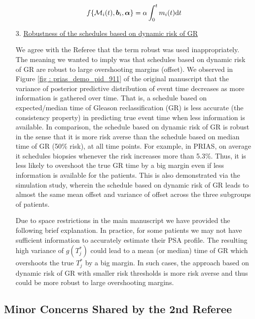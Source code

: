 \begin{enumerate}
    \begin{equation}
    f\{\mathcal{M}_i(t), \boldsymbol{b}_i, \boldsymbol{\alpha}\} = \alpha \int_0^t m_i(t) \mathrm{d}{t}
    \end{equation}

    \item[3.] \underline{Robustness of the schedules based on dynamic risk of GR}
    
    We agree with the Referee that the term robust was used inappropriately. The meaning we wanted to imply was that schedules based on dynamic risk of GR are robust to large overshooting margins (offset). We observed in Figure \ref{fig : prias_demo_pid_911} of the original manuscript that the variance of posterior predictive distribution of event time decreases as more information is gathered over time. That is, a schedule based on expected/median time of Gleason reclassification (GR) is less accurate (the consistency property) in predicting true event time when less information is available. In comparison, the schedule based on dynamic risk of GR is robust in the sense that it is more risk averse than the schedule based on median time of GR (50\% risk), at all time points. For example, in PRIAS, on average it schedules biopsies whenever the risk increases more than 5.3\%. Thus, it is less likely to overshoot the true GR time by a big margin even if less information is available for the patients. This is also demonstrated via the simulation study, wherein the schedule based on dynamic risk of GR leads to almost the same mean offset and variance of offset across the three subgroups of patients. 

    Due to space restrictions in the main manuscript we have provided the following brief explanation. In practice, for some patients we may not have sufficient information to accurately estimate their PSA profile. The resulting high variance of $g(T^*_j)$ could lead to a mean (or median) time of GR which overshoots the true $T_j^*$ by a big margin. In such cases, the approach based on dynamic risk of GR with smaller risk thresholds is more risk averse and thus could be more robust to large overshooting margins. 

\end{enumerate}

\subsection*{Minor Concerns Shared by the 2nd Referee}

